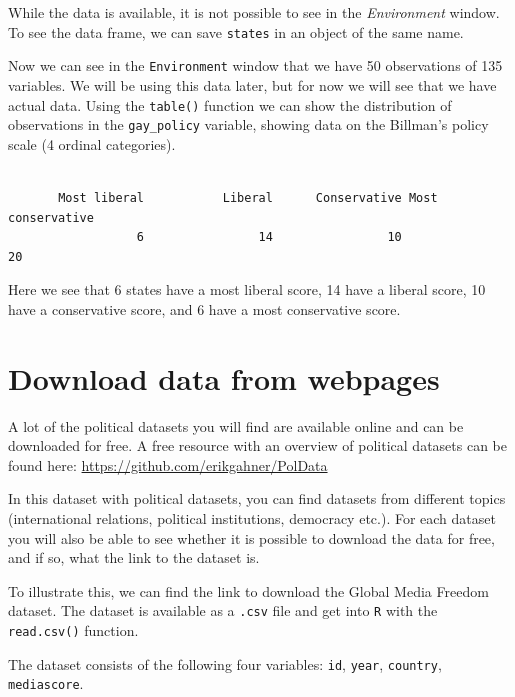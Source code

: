 \documentclass[12pt,oneside]{reedthesis}
\theoremstyle{definition}
\theoremstyle{definition}
\theoremstyle{definition}
\theoremstyle{remark}
\begin{document}
  While the data is available, it is not possible to see in the
  \emph{Environment} window. To see the data frame, we can save
  \texttt{states} in an object of the same name.
  \begin{Shaded}
  \begin{Highlighting}[]
  \StringTok{ }
  \end{Highlighting}
  \end{Shaded}
  Now we can see in the \texttt{Environment} window that we have 50
  observations of 135 variables. We will be using this data later, but for
  now we will see that we have actual data. Using the \texttt{table()}
  function we can show the distribution of observations in the
  \texttt{gay\_policy} variable, showing data on the Billman's policy
  scale (4 ordinal categories).
  \begin{Shaded}
  \begin{Highlighting}[]
  \OperatorTok{$}
  \end{Highlighting}
  \end{Shaded}
  \begin{verbatim}
  
       Most liberal           Liberal      Conservative Most conservative 
                  6                14                10                20 
  \end{verbatim}
  Here we see that 6 states have a most liberal score, 14 have a liberal
  score, 10 have a conservative score, and 6 have a most conservative
  score.
  
  \section{Download data from webpages}\label{download-data-from-webpages}
  
  A lot of the political datasets you will find are available online and
  can be downloaded for free. A free resource with an overview of
  political datasets can be found here:
  \url{https://github.com/erikgahner/PolData}
  
  In this dataset with political datasets, you can find datasets from
  different topics (international relations, political institutions,
  democracy etc.). For each dataset you will also be able to see whether
  it is possible to download the data for free, and if so, what the link
  to the dataset is.
  
  To illustrate this, we can find the link to download the Global Media
  Freedom dataset. The dataset is available as a \texttt{.csv} file and
  get into \texttt{R} with the \texttt{read.csv()} function.
  \begin{Shaded}
  \begin{Highlighting}[]
  \StringTok{ }\NormalTok{(}
  \NormalTok{  )}
  \end{Highlighting}
  \end{Shaded}
  The dataset consists of the following four variables: \texttt{id},
  \texttt{year}, \texttt{country}, \texttt{mediascore}.
  
\end{document}
